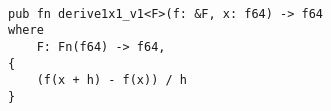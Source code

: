 \begin{lstlisting}[]

pub fn derive1x1_v1<F>(f: &F, x: f64) -> f64
where
    F: Fn(f64) -> f64,
{
    (f(x + h) - f(x)) / h
}


\end{lstlisting}
